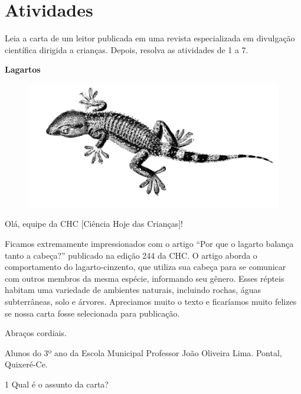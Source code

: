 \section{Atividades}

Leia a carta de um leitor publicada em uma revista especializada em
divulgação científica dirigida a crianças. Depois, resolva as atividades de 1 a 7.

\begin{myquote}
\textbf{Lagartos}

\begin{figure}
\includegraphics[width=.5\textwidth, angle=-95]{./media/image19d.png}
\end{figure}

Olá, equipe da CHC [Ciência Hoje das Crianças]! 

Ficamos extremamente impressionados com o artigo 
``Por que o lagarto balança tanto a cabeça?'' 
publicado na edição 244 da CHC. O artigo aborda 
o comportamento do lagarto-cinzento, que utiliza 
sua cabeça para se comunicar com outros membros 
da mesma espécie, informando seu gênero. 
Esses répteis habitam uma variedade de ambientes naturais, 
incluindo rochas, águas subterrâneas, solo e árvores. 
Apreciamos muito o texto e ficaríamos muito felizes 
se nossa carta fosse selecionada para publicação. 

Abraços cordiais.

Alunos do 3º ano da Escola Municipal Professor João Oliveira Lima. Pontal, Quixeré-Ce.

\end{myquote}

\num{1} Qual é o assunto da carta?



